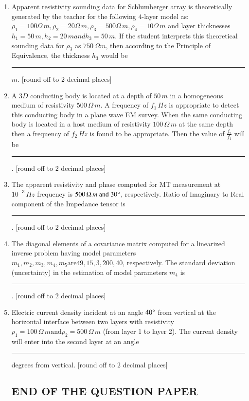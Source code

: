 \documentclass[journal,12pt,onecolumn]{IEEEtran}
\theoremstyle{remark}
\begin{document}
\begin{enumerate}
    \item Apparent resistivity sounding data for Schlumberger array is theoretically generated by the teacher for the following $4$-layer model as: $\rho_1 = 100 \Omega\,m, \rho_2 = 20 \Omega\,m, \rho_3 = 500 \Omega\,m, \rho_4 = 10 \Omega\,m$ and layer thicknesses $h_1 = 50\,m, h_2 = 20\,m and h_3 = 50\,m$. If the student interprets this theoretical sounding data for $\rho_3$ as $750\,\Omega m$, then according to the Principle of Equivalence, the thickness $h_3$ would be \rule{3cm}{0.15mm} $m$. [round off to $2$ decimal places] \hfill{}
    
    \item A $3D$ conducting body is located at a depth of $50\,m$ in a homogeneous medium of resistivity $500\,\Omega\,m$. A frequency of $f_1\,Hz$ is appropriate to detect this conducting body in a plane wave EM survey. When the same conducting body is located in a host medium of resistivity $100\,\Omega\,m$ at the same depth then a frequency of $f_2\,Hz$ is found to be appropriate. Then the value of $\frac{f_2}{f_1}$ will be \rule{3cm}{0.15mm}. [round off to $2$ decimal places] \hfill{}
    
    \item The apparent resistivity and phase computed for MT measurement at $10^{-3}\,Hz$ frequency is $500\,\Omega\,m \text{ and } 30\degree$, respectively. Ratio of Imaginary to Real component of the Impedance tensor is \rule{3cm}{0.15mm}. [round off to $2$ decimal places] \hfill{}
    
    \item The diagonal elements of a covariance matrix computed for a linearized inverse problem having model parameters $m_1, m_2, m_3, m_4, m_5 \text{are} 49, 15, 3, 200, 40$, respectively. The standard deviation (uncertainty) in the estimation of model parameters $m_4$ is \rule{3cm}{0.15mm}. [round off to $2$ decimal places]\hfill{}
    
    \item Electric current density incident at an angle $40\degree$ from vertical at the horizontal interface between two layers with resistivity $\rho_1 = 100\,\Omega\,m \text{and} \rho_2 = 500\,\Omega\,m$ (from layer 1 to layer 2). The current density will enter into the second layer at an angle \rule{3cm}{0.15mm} degrees from vertical. [round off to $2$ decimal places] \hfill{}

\centering\subsection*{END OF THE QUESTION PAPER}
\end{enumerate}
\end{document}
